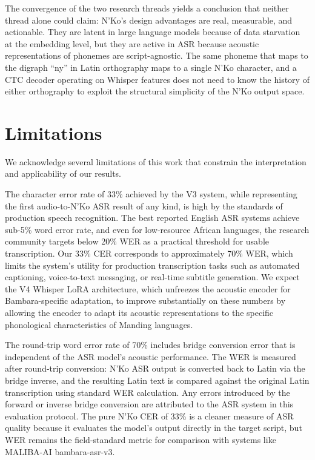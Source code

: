 \documentclass[11pt]{article}
\newcommand{\nko}{N'Ko}
\begin{document}
The convergence of the two research threads yields a conclusion that neither thread alone could claim: \nko{}'s design advantages are real, measurable, and actionable. They are latent in large language models because of data starvation at the embedding level, but they are active in ASR because acoustic representations of phonemes are script-agnostic. The same phoneme that maps to the digraph ``ny'' in Latin orthography maps to a single \nko{} character, and a CTC decoder operating on Whisper features does not need to know the history of either orthography to exploit the structural simplicity of the \nko{} output space.

\section{Limitations}
\label{sec:limitations}

We acknowledge several limitations of this work that constrain the interpretation and applicability of our results.

The character error rate of 33\% achieved by the V3 system, while representing the first audio-to-\nko{} ASR result of any kind, is high by the standards of production speech recognition. The best reported English ASR systems achieve sub-5\% word error rate, and even for low-resource African languages, the research community targets below 20\% WER as a practical threshold for usable transcription. Our 33\% CER corresponds to approximately 70\% WER, which limits the system's utility for production transcription tasks such as automated captioning, voice-to-text messaging, or real-time subtitle generation. We expect the V4 Whisper LoRA architecture, which unfreezes the acoustic encoder for Bambara-specific adaptation, to improve substantially on these numbers by allowing the encoder to adapt its acoustic representations to the specific phonological characteristics of Manding languages.

The round-trip word error rate of 70\% includes bridge conversion error that is independent of the ASR model's acoustic performance. The WER is measured after round-trip conversion: \nko{} ASR output is converted back to Latin via the bridge inverse, and the resulting Latin text is compared against the original Latin transcription using standard WER calculation. Any errors introduced by the forward or inverse bridge conversion are attributed to the ASR system in this evaluation protocol. The pure \nko{} CER of 33\% is a cleaner measure of ASR quality because it evaluates the model's output directly in the target script, but WER remains the field-standard metric for comparison with systems like MALIBA-AI bambara-asr-v3.
\end{document}
